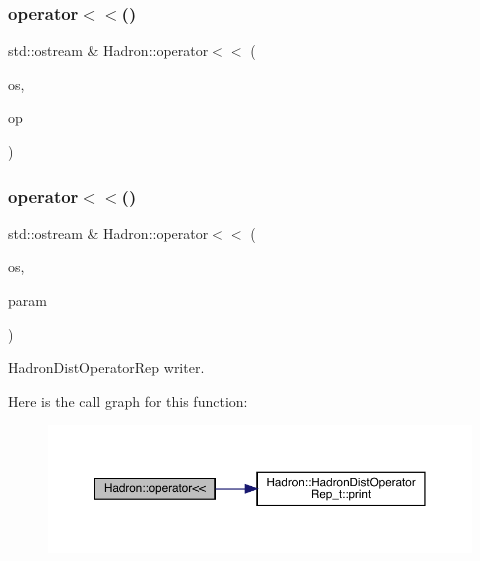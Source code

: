 \subsubsection{\texorpdfstring{operator$<$$<$()}{operator<<()}\hspace{0.1cm}{\footnotesize\ttfamily [45/48]}}
{\footnotesize\ttfamily std\+::ostream \& Hadron\+::operator$<$$<$ (\begin{DoxyParamCaption}\item[{std\+::ostream \&}]{os,  }\item[{const \mbox{\hyperlink{structHadron_1_1SingleHadronQuarkFlavor__t}{Single\+Hadron\+Quark\+Flavor\+\_\+t}} \&}]{op }\end{DoxyParamCaption})}

\mbox{\label{namespaceHadron_a4ff4eac2687982e6a251bf3524940b01}} 
\subsubsection{\texorpdfstring{operator$<$$<$()}{operator<<()}\hspace{0.1cm}{\footnotesize\ttfamily [46/48]}}
{\footnotesize\ttfamily std\+::ostream \& Hadron\+::operator$<$$<$ (\begin{DoxyParamCaption}\item[{std\+::ostream \&}]{os,  }\item[{const \mbox{\hyperlink{classHadron_1_1HadronDistOperatorRep__t}{Hadron\+Dist\+Operator\+Rep\+\_\+t}} \&}]{param }\end{DoxyParamCaption})}



Hadron\+Dist\+Operator\+Rep writer. 

Here is the call graph for this function\+:
\nopagebreak
\begin{figure}[H]
\begin{center}
\leavevmode
\includegraphics[width=350pt]{d1/daf/namespaceHadron_a4ff4eac2687982e6a251bf3524940b01_cgraph}
\end{center}
\end{figure}
\mbox{\label{namespaceHadron_ac39a55fe17a7ba63e515041398ff55e4}} 
